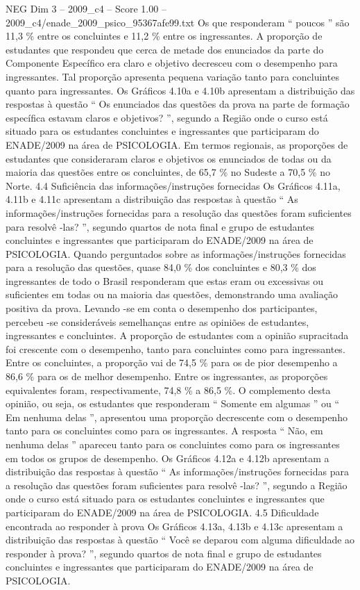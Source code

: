 \begin{textsample}{NEG Dim 3 – 2009\_c4 – Score 1.00 – 2009\_c4/enade\_2009\_psico\_95367afe99.txt}
Os que responderam “ poucos ” são 11,3 \% entre os concluintes e 11,2 \% entre os ingressantes.
A proporção de estudantes que respondeu que cerca de metade dos enunciados da parte do Componente Específico era claro e objetivo decresceu com o desempenho para ingressantes.
Tal proporção apresenta pequena variação tanto para concluintes quanto para ingressantes.
Os Gráficos 4.10a e 4.10b apresentam a distribuição das respostas à questão “ Os enunciados das questões da prova na parte de formação específica estavam claros e objetivos? ”, segundo a Região onde o curso está situado para os estudantes concluintes e ingressantes que participaram do ENADE/2009 na área de PSICOLOGIA.
Em termos regionais, as proporções de estudantes que consideraram claros e objetivos os enunciados de todas ou da maioria das questões entre os concluintes, de 65,7 \% no Sudeste a 70,5 \% no Norte. 4.4 Suficiência das informações/instruções fornecidas Os Gráficos 4.11a, 4.11b e 4.11c apresentam a distribuição das respostas à questão “ As informações/instruções fornecidas para a resolução das questões foram suficientes para resolvê -las? ”, segundo quartos de nota final e grupo de estudantes concluintes e ingressantes que participaram do ENADE/2009 na área de PSICOLOGIA.
Quando perguntados sobre as informações/instruções fornecidas para a resolução das questões, quase 84,0 \% dos concluintes e 80,3 \% dos ingressantes de todo o Brasil responderam que estas eram ou excessivas ou suficientes em todas ou na maioria das questões, demonstrando uma avaliação positiva da prova.
Levando -se em conta o desempenho dos participantes, percebeu -se consideráveis semelhanças entre as opiniões de estudantes, ingressantes e concluintes.
A proporção de estudantes com a opinião supracitada foi crescente com o desempenho, tanto para concluintes como para ingressantes.
Entre os concluintes, a proporção vai de 74,5 \% para os de pior desempenho a 86,6 \% para os de melhor desempenho.
Entre os ingressantes, as proporções equivalentes foram, respectivamente, 74,8 \% a 86,5 \%.
O complemento desta opinião, ou seja, os estudantes que responderam “ Somente em algumas ” ou “ Em nenhuma delas ”, apresentou uma proporção decrescente com o desempenho tanto para os concluintes como para os ingressantes.
A resposta “ Não, em nenhuma delas ” apareceu tanto para os concluintes como para os ingressantes em todos os grupos de desempenho.
Os Gráficos 4.12a e 4.12b apresentam a distribuição das respostas à questão “ As informações/instruções fornecidas para a resolução das questões foram suficientes para resolvê -las? ”, segundo a Região onde o curso está situado para os estudantes concluintes e ingressantes que participaram do ENADE/2009 na área de PSICOLOGIA. 4.5 Dificuldade encontrada ao responder à prova Os Gráficos 4.13a, 4.13b e 4.13c apresentam a distribuição das respostas à questão “ Você se deparou com alguma dificuldade ao responder à prova? ”, segundo quartos de nota final e grupo de estudantes concluintes e ingressantes que participaram do ENADE/2009 na área de PSICOLOGIA.

\end{textsample}
